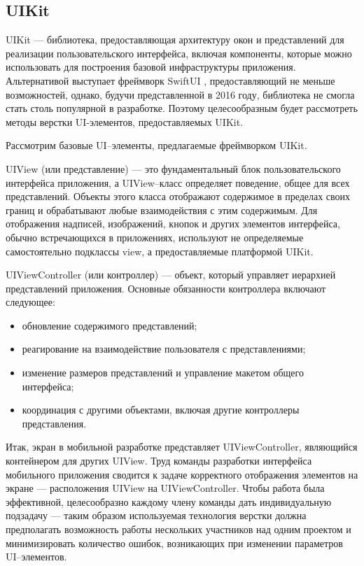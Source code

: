 \subsection{UIKit}

UIKit \cite{uikit} --- библиотека, предоставляющая архитектуру окон и представлений для реализации пользовательского интерфейса, включая компоненты, которые можно использовать для построения базовой инфраструктуры приложения. 
Альтернативой выступает фреймворк SwiftUI \cite{swiftui}, предоставляющий не меньше возможностей, однако, будучи представленной в 2016 году, библиотека не смогла стать столь популярной в разработке. 
Поэтому целесообразным будет рассмотреть методы верстки UI-элементов, предоставляемых UIKit.


Рассмотрим базовые UI--элементы, предлагаемые фреймворком UIKit.

UIView (или представление) \cite{uiview} --- это фундаментальный блок пользовательского интерфейса приложения, а UIView--класс определяет поведение, общее для всех представлений. 
Объекты этого класса отображают содержимое в пределах своих границ и обрабатывают любые взаимодействия с этим содержимым. 
Для отображения надписей, изображений, кнопок и других элементов интерфейса, обычно встречающихся в приложениях, используют не определяемые самостоятельно подклассы view, а предоставляемые платформой UIKit. 

UIViewController (или контроллер) \cite{controller} --- объект, который управляет иерархией представлений приложения. Основные обязанности контроллера включают следующее:

\begin{itemize}[label=---]
	\item обновление содержимого представлений;
	\item реагирование на взаимодействие пользователя с представлениями;
	\item изменение размеров представлений и управление макетом общего интерфейса;
	\item координация с другими объектами, включая другие контроллеры представления.
\end{itemize}

Итак, экран в мобильной разработке представляет UIViewController, являющийся контейнером для других UIView. 
Труд команды разработки интерфейса мобильного приложения сводится к задаче корректного отображения элементов на экране --- расположения UIView на UIViewController. 
Чтобы работа была эффективной, целесообразно каждому члену команды дать индивидуальную подзадачу --- таким образом используемая технология верстки должна предполагать возможность работы нескольких участников над одним проектом и минимизировать количество ошибок, возникающих при изменении параметров UI--элементов. 


